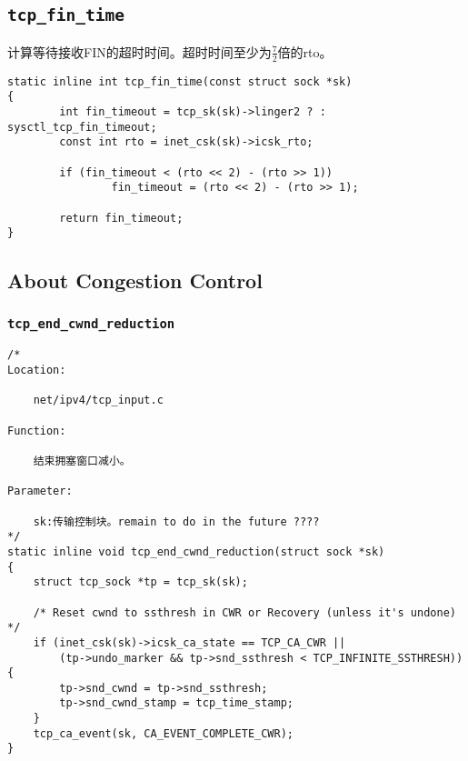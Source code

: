 \subsection{\texttt{tcp_fin_time}}
计算等待接收FIN的超时时间。超时时间至少为$\frac{7}{2}$倍的rto。
\begin{verbatim}
static inline int tcp_fin_time(const struct sock *sk)
{
        int fin_timeout = tcp_sk(sk)->linger2 ? : sysctl_tcp_fin_timeout;
        const int rto = inet_csk(sk)->icsk_rto;

        if (fin_timeout < (rto << 2) - (rto >> 1))
                fin_timeout = (rto << 2) - (rto >> 1);

        return fin_timeout;
}
\end{verbatim}
	\subsection{About Congestion Control}
		\subsubsection{\texttt{tcp_end_cwnd_reduction}}
\begin{verbatim}
/* 
Location:

	net/ipv4/tcp_input.c

Function:

	结束拥塞窗口减小。

Parameter:

	sk:传输控制块。remain to do in the future ????
*/
static inline void tcp_end_cwnd_reduction(struct sock *sk)
{
	struct tcp_sock *tp = tcp_sk(sk);

	/* Reset cwnd to ssthresh in CWR or Recovery (unless it's undone) */
	if (inet_csk(sk)->icsk_ca_state == TCP_CA_CWR ||
	    (tp->undo_marker && tp->snd_ssthresh < TCP_INFINITE_SSTHRESH)) {
		tp->snd_cwnd = tp->snd_ssthresh;
		tp->snd_cwnd_stamp = tcp_time_stamp;
	}
	tcp_ca_event(sk, CA_EVENT_COMPLETE_CWR);
}
\end{verbatim}
